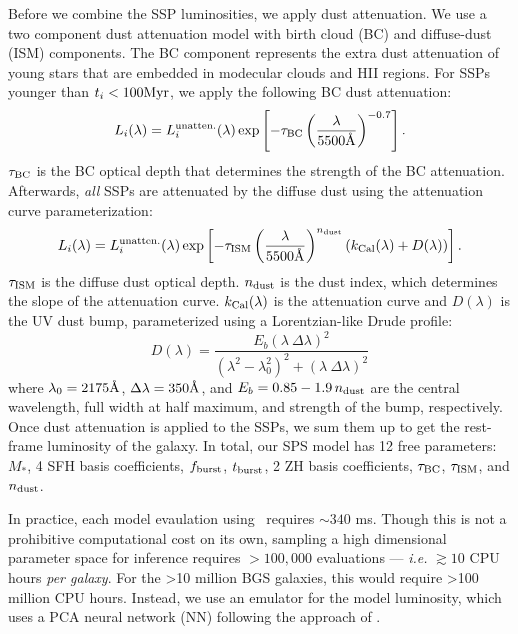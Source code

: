 Before we combine the SSP luminosities, we apply dust attenuation.
We use a two component \cite{charlot2000} dust attenuation model with birth
cloud (BC) and diffuse-dust (ISM) components. 
The BC component represents the extra dust attenuation of young stars that are
embedded in modecular clouds and HII regions. 
For SSPs younger than $t_i < 100{\rm Myr}$, we apply the
following BC dust attenuation: 
\begin{equation}
    L_i(\lambda) = L_i^{\rm unatten.}(\lambda) \exp\left[-\tau_{\rm BC} \left(
    \frac{\lambda}{5500\AA} \right)^{-0.7} \right].
\end{equation}
$\tau_{\rm BC}$ is the BC optical depth that determines the strength of the BC
attenuation. 
Afterwards, {\em all} SSPs are attenuated by the diffuse dust using the
\cite{kriek2013} attenuation curve parameterization: 
\begin{equation}
    L_i(\lambda) = L_i^{\rm unatten.}(\lambda) \exp\left[-\tau_{\rm ISM} \left(
    \frac{\lambda}{5500\AA} \right)^{n_{\rm dust}} \left(k_{\rm Cal}(\lambda) +
    D(\lambda) \right) \right].
\end{equation}
$\tau_{\rm ISM}$ is the diffuse dust optical depth.
$n_{\rm dust}$ is the \cite{calzetti2001} dust index, which determines the
slope of the attenuation curve. 
$k_{\rm Cal}(\lambda)$ is the \cite{calzetti2001} attenuation curve and
$D(\lambda)$ is the UV dust bump, parameterized using a Lorentzian-like Drude 
profile:
\begin{equation}
    D(\lambda) = \frac{E_b(\lambda~\Delta \lambda)^2}{(\lambda^2 -
    \lambda_0^2)^2 + (\lambda~\Delta \lambda)^2}
\end{equation}
where $\lambda_0 = 2175 \AA$, $\Delta \lambda = 350\AA$, and 
$E_b=0.85 - 1.9\,n_{\rm dust}$ are the central wavelength, full width at half
maximum, and strength of the bump, respectively. 
Once dust attenuation is applied to the SSPs, we sum them up to get the
rest-frame luminosity of the galaxy. 
In total, our SPS model has 12 free parameters: $M_*$, 4 SFH basis
coefficients, $f_{\rm burst}$, $t_{\rm burst}$, 2 ZH basis coefficients,
$\tau_{\rm BC}$, $\tau_{\rm ISM}$, and $n_{\rm dust}$. 


In practice, each model evaulation using \fsps~requires ${\sim}340$ ms. 
Though this is not a prohibitive computational cost on its own, sampling a
high dimensional parameter space for inference requires $>100,000$ evaluations
--- \emph{i.e.} $\gtrsim10$ CPU hours \emph{per galaxy}. 
For the >10 million BGS galaxies, this would require >100 million CPU hours. 
Instead, we use an emulator for the model luminosity, which uses a PCA neural
network (NN) following the approach of \cite{alsing2019}. 


